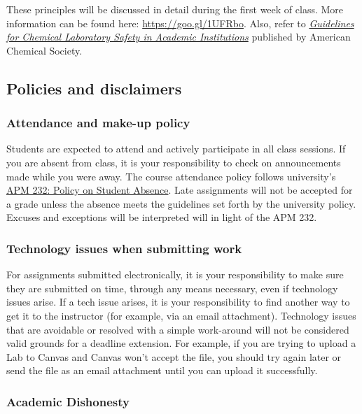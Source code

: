 These principles will be discussed in detail during the first week of
class. More information can be found here: \url{https://goo.gl/1UFRbo}.
Also, refer to
\href{https://www.acs.org/content/dam/acsorg/about/governance/committees/chemicalsafety/publications/acs-safety-guidelines-academic.pdf}{\emph{Guidelines
for Chemical Laboratory Safety in Academic Institutions}} published by
American Chemical Society.

\subsection{Policies and disclaimers}\label{policies-and-disclaimers}

\subsubsection{Attendance and make-up
policy}\label{attendance-and-make-up-policy}

Students are expected to attend and actively participate in all class
sessions. If you are absent from class, it is your responsibility to
check on announcements made while you were away. The course attendance
policy follows university's
\href{http://www.fresnostate.edu/academics/facultyaffairs/documents/apm/232.pdf}{APM
232: Policy on Student Absence}. Late assignments will not be accepted
for a grade unless the absence meets the guidelines set forth by the
university policy. Excuses and exceptions will be interpreted will in
light of the APM 232.

\subsubsection{Technology issues when submitting
work}\label{technology-issues-when-submitting-work}

For assignments submitted electronically, it is your responsibility to
make sure they are submitted on time, through any means necessary, even
if technology issues arise. If a tech issue arises, it is your
responsibility to find another way to get it to the instructor (for
example, via an email attachment). Technology issues that are avoidable
or resolved with a simple work-around will not be considered valid
grounds for a deadline extension. For example, if you are trying to
upload a Lab to Canvas and Canvas won't accept the file, you should try
again later or send the file as an email attachment until you can upload
it successfully.

\subsubsection{Academic Dishonesty}\label{academic-dishonesty}

